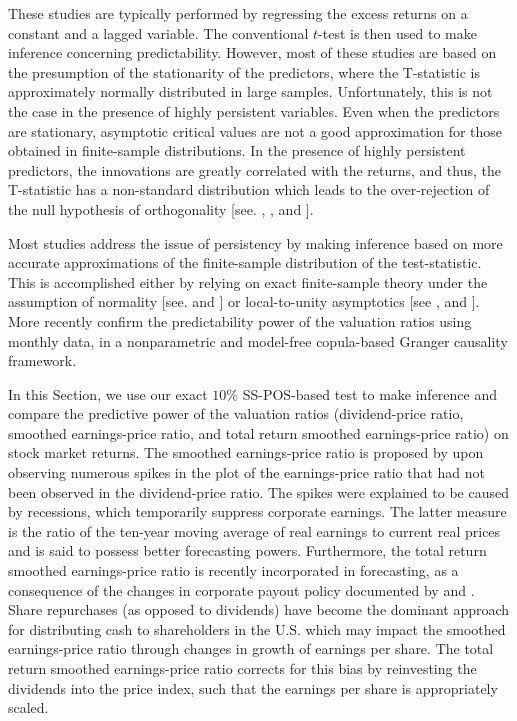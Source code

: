 \documentclass[harvard,11pt]{article}
\begin{document}
These studies are typically performed by regressing the excess returns on a constant and a lagged variable. The conventional $t$-test is then used to make inference concerning predictability. However, most of these studies are based on the presumption of the stationarity of the predictors, where the T-statistic is approximately normally distributed in large samples. Unfortunately, this is not the case in the presence of highly persistent variables. Even when the predictors are stationary, asymptotic critical values are not a good approximation for those obtained in finite-sample distributions. In the presence of highly persistent predictors, the innovations are greatly correlated with the returns, and thus, the T-statistic has a non-standard distribution which leads to the over-rejection of the null hypothesis of orthogonality [see. \citet{elliott1994inference}, \citet{mankiw1986we}, \citet{stambaugh1999predictive} and \citet{campbell2006efficient}].

 Most studies address the issue of persistency by making inference based on more accurate appro\-ximations of the finite-sample distribution of the test-statistic. This is accomplished either by relying on exact finite-sample theory under the assumption of normality [see. \citet{evans1981calculation,evans1984testing} and \citet{stambaugh1999predictive}] or local-to-unity asymptotics [see \citet{elliott1994inference}, \citet{campbell2006efficient} and \citet{torous2004predicting}]. More recently \citet{taamouti2014nonparametric} confirm the predictability power of the valuation ratios using monthly data, in a nonparametric and model-free copula-based Granger causality framework. 

In this Section, we use our exact $10\%$ SS-POS-based test to make inference and compare the
predictive power of the valuation ratios (dividend-price ratio, smoothed earnings-price ratio, and total return smoothed earnings-price ratio) on stock market returns. The smoothed earnings-price ratio is proposed by \citet{campbell1988dividend,campbell2001valuation} upon observing numerous spikes in the plot of the earnings-price ratio that had not been observed in the dividend-price ratio. The spikes were explained to be caused by recessions, which temporarily suppress corporate earnings. The latter measure is the ratio of the ten-year moving average of real earnings to current real prices and is said to possess better forecasting powers. Furthermore, the total return smoothed earnings-price ratio is recently incorporated in forecasting, as a consequence of the changes in corporate payout policy documented by \citet{bunn2014cape} and \citet{jivraj2017many}. Share repurchases (as opposed to dividends) have become the dominant approach for distributing cash to shareholders in the U.S. which may impact the smoothed earnings-price ratio through changes in growth of earnings per share. The total return smoothed earnings-price ratio corrects for this bias by reinvesting the dividends into the price index, such that the earnings per share is appropriately scaled. 
\end{document}
